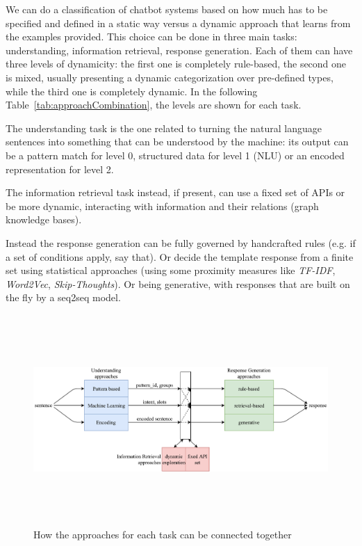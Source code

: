We can do a classification of chatbot systems based on how much has to be specified and defined in a static way versus a dynamic approach that learns from the examples provided. This choice can be done in three main tasks: understanding, information retrieval, response generation. Each of them can have three levels of dynamicity: the first one is completely rule-based, the second one is mixed, usually presenting a dynamic categorization over pre-defined types, while the third one is completely dynamic. In the following Table~\ref{tab:approachCombination}, the levels are shown for each task.



The understanding task is the one related to turning the natural language sentences into something that can be understood by the machine: its output can be a pattern match for level 0, structured data for level 1 (NLU) or an encoded representation for level 2. 

The information retrieval task instead, if present, can use a fixed set of APIs or be more dynamic, interacting with information and their relations (graph knowledge bases).

Instead the response generation can be fully governed by handcrafted rules (e.g. if a set of conditions apply, say that). Or decide the template response from a finite set using statistical approaches (using some proximity measures like \textit{TF-IDF}, \textit{Word2Vec}, \textit{Skip-Thoughts}). Or being generative, with responses that are built on the fly by a seq2seq model.

\begin{figure}[!htbp]
    \centering
    \includegraphics[max width=\linewidth,max height=8cm,keepaspectratio]{figures/approachesCombination}
    \caption{How the approaches for each task can be connected together}\label{fig:approachesCombination}
\end{figure}

